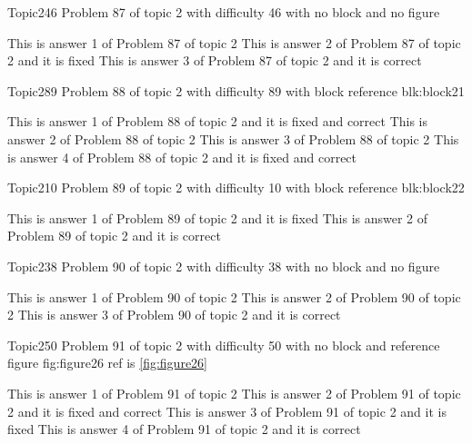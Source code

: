 \documentclass[master]{exam}
\begin{document}
\begin{problem}{Topic2}{46}
	Problem 87 of topic 2 with difficulty 46 with no block and no figure
	\begin{answers}
		\answer This is answer 1 of Problem 87 of topic 2 
		\answer[fixed] This is answer 2 of Problem 87 of topic 2 and it is fixed
		\answer[correct] This is answer 3 of Problem 87 of topic 2 and it is correct
	\end{answers}
\end{problem}

\begin{problem}[requires=blk:block21]{Topic2}{89}
	Problem 88 of topic 2 with difficulty 89 with block reference blk:block21
	\begin{answers}
		 This is answer 1 of Problem 88 of topic 2 and it is fixed and correct
		\answer This is answer 2 of Problem 88 of topic 2 
		\answer This is answer 3 of Problem 88 of topic 2 
		 This is answer 4 of Problem 88 of topic 2 and it is fixed and correct
	\end{answers}
\end{problem}

\begin{problem}[requires=blk:block22]{Topic2}{10}
	Problem 89 of topic 2 with difficulty 10 with block reference blk:block22
	\begin{answers}
		\answer[fixed] This is answer 1 of Problem 89 of topic 2 and it is fixed
		\answer[correct] This is answer 2 of Problem 89 of topic 2 and it is correct
	\end{answers}
\end{problem}

\begin{problem}{Topic2}{38}
	Problem 90 of topic 2 with difficulty 38 with no block and no figure
	\begin{answers}
		\answer This is answer 1 of Problem 90 of topic 2 
		\answer This is answer 2 of Problem 90 of topic 2 
		\answer[correct] This is answer 3 of Problem 90 of topic 2 and it is correct
	\end{answers}
\end{problem}

\begin{problem}{Topic2}{50}
	Problem 91 of topic 2 with difficulty 50 with no block and reference figure fig:figure26 ref is \ref{fig:figure26}
	\begin{answers}
		\answer This is answer 1 of Problem 91 of topic 2 
		 This is answer 2 of Problem 91 of topic 2 and it is fixed and correct
		\answer[fixed] This is answer 3 of Problem 91 of topic 2 and it is fixed
		\answer[correct] This is answer 4 of Problem 91 of topic 2 and it is correct
	\end{answers}
\end{problem}
\end{document}
